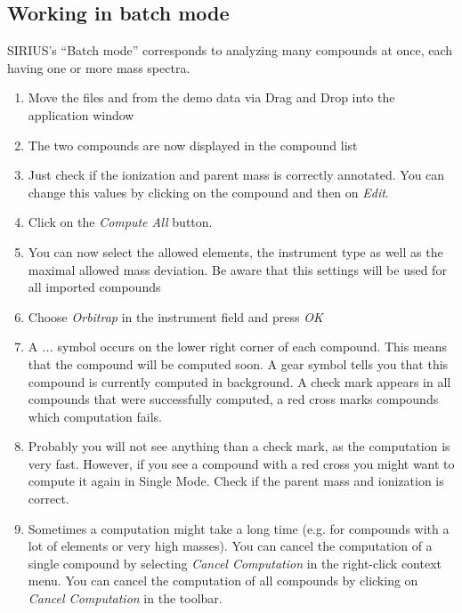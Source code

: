 \documentclass[letterpaper,10pt,openany,oneside]{sphinxmanual}
\newcommand\gui[1]{\textsl{\guilsinglleft#1\guilsinglright\xspace}}
\begin{document}
\subsection{Working in batch mode}

SIRIUS's ``Batch mode'' corresponds to analyzing many compounds at once,
each having one or more mass spectra.

\begin{enumerate}
	\item {} 
	Move the files  and  from the demo data via Drag and Drop into the application window
	
	\item {} 
	The two compounds are now displayed in the compound list
	
	\item {} 
	Just check if the ionization and parent mass is correctly annotated. You can change this values by clicking on the compound and then on \gui{Edit}.
	
	\item {} 
	Click on the \gui{Compute All} button.
	
	\item {} 
	You can now select the allowed elements, the instrument type as well as the maximal allowed mass deviation. Be aware that this settings will be used for all imported compounds
	
	\item {} 
	Choose \gui{Orbitrap} in the instrument field and press \gui{OK}
	
	\item {} 
	A \gui{...} symbol occurs on the lower right corner of each compound. This 
	means that the compound will be computed soon. A gear symbol tells you that 
	this compound is currently computed in background. A check mark appears in 
	all compounds that were successfully computed, a red cross marks compounds 
	which computation fails.
	
	\item {} 
	Probably you will not see anything than a check mark, as the computation is very fast. However, if you see a compound with a red cross you might want to compute it again in Single Mode. Check if the parent mass and ionization is correct.
	
	\item {} 
	Sometimes a computation might take a long time (e.g. for compounds with a lot 
	of elements or very high masses). You can cancel the computation of a single 
	compound by selecting \gui{Cancel Computation} in the right-click context 
	menu. You can cancel the computation of all compounds by clicking on 
	\gui{Cancel Computation} in the toolbar.
\end{enumerate}
\end{document}
